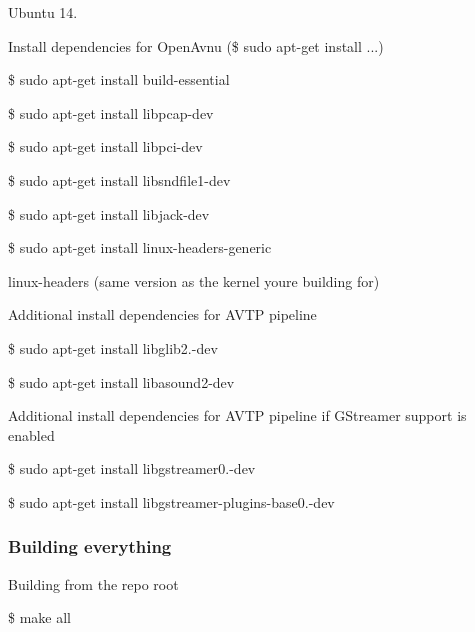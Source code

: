 \begin{DoxyItemize}
\item Ubuntu 14.
\item Install dependencies for Open\+Avnu (\$ sudo apt-\/get install ...)
\begin{DoxyItemize}
\item \$ sudo apt-\/get install build-\/essential
\item \$ sudo apt-\/get install libpcap-\/dev
\item \$ sudo apt-\/get install libpci-\/dev
\item \$ sudo apt-\/get install libsndfile1-\/dev
\item \$ sudo apt-\/get install libjack-\/dev
\item \$ sudo apt-\/get install linux-\/headers-\/generic
\begin{DoxyItemize}
\item linux-\/headers (same version as the kernel you\textquotesingle{}re building for)
\end{DoxyItemize}
\end{DoxyItemize}
\item Additional install dependencies for A\+V\+TP pipeline
\begin{DoxyItemize}
\item \$ sudo apt-\/get install libglib2.-\/dev
\item \$ sudo apt-\/get install libasound2-\/dev
\end{DoxyItemize}
\item Additional install dependencies for A\+V\+TP pipeline if G\+Streamer support is enabled
\begin{DoxyItemize}
\item \$ sudo apt-\/get install libgstreamer0.-\/dev
\item \$ sudo apt-\/get install libgstreamer-\/plugins-\/base0.-\/dev
\end{DoxyItemize}
\end{DoxyItemize}

\subsubsection*{Building everything}


\begin{DoxyItemize}
\item Building from the repo root
\item \$ make all
\end{DoxyItemize}

